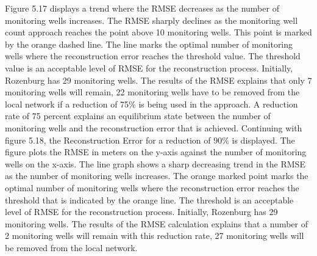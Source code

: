 Figure 5.17 displays a trend where the RMSE decreases as the number of monitoring wells increases. The RMSE sharply declines as the monitoring well count approach reaches the point above 10 monitoring wells. This point is marked by the orange dashed line. The line marks the optimal number of monitoring wells where the reconstruction error reaches the threshold value. The threshold value is an acceptable level of RMSE for the reconstruction process. Initially, Rozenburg has 29 monitoring wells. The results of the RMSE explains that only 7 monitoring wells will remain, 22 monitoring wells have to be removed from the local network if a reduction of 75\% is being used in the approach. A reduction rate of 75 percent explains an equilibrium state between the number of monitoring wells and the reconstruction error that is achieved. 
\newline
Continuing with figure 5.18, the Reconstruction Error for a reduction of 90\% is displayed. The figure plots the RMSE in meters on the y-axis against the number of monitoring wells on the x-axis. The line graph shows a sharp decreasing trend in the RMSE as the number of monitoring wells increases. The orange marked point marks the optimal number of monitoring wells where the reconstruction error reaches the threshold that is indicated by the orange line. The threshold is an acceptable level of RMSE for the reconstruction process. Initially, Rozenburg has 29 monitoring wells. The results of the RMSE calculation explains that a number of 2 monitoring wells will remain with this reduction rate, 27 monitoring wells will be removed from the local network. 

\clearpage

